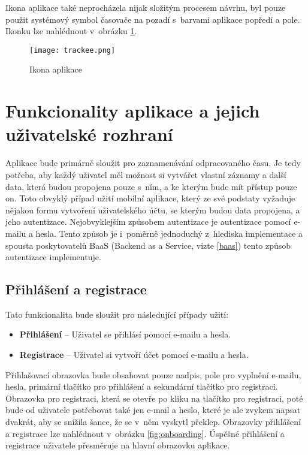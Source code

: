 Ikona aplikace také neprocházela nijak složitým procesem návrhu, byl pouze použit systémový symbol časovače na pozadí s~barvami aplikace popředí a pole. Ikonku lze nahlédnout v~obrázku \ref{fig:app-icon}.

\begin{figure}[h]
	\centering
	\texttt{[image: trackee.png]}
	\caption{Ikona aplikace}
	\label{fig:app-icon}
\end{figure}

\section{Funkcionality aplikace a jejich uživatelské rozhraní}\label{features}

Aplikace bude primárně sloužit pro zaznamenávání odpracovaného času. Je tedy potřeba, aby každý uživatel měl možnost si vytvářet vlastní záznamy a další data, která budou propojena pouze s~ním, a ke kterým bude mít přístup pouze on. Toto obvyklý případ užití mobilní aplikace, který ze své podstaty vyžaduje nějakou formu vytvoření uživatelského účtu, se kterým budou data propojena, a jeho autentizace. Nejobvyklejším způsobem autentizace je autentizace pomocí e-mailu a hesla. Tento způsob je i~poměrně jednoduchý z~hlediska implementace a spousta poskytovatelů BaaS (Backend as a Service, vizte \ref{baas}) tento způsob autentizace implementuje. 

\subsection{Přihlášení a registrace}\label{feature-onboarding}

Tato funkcionalita bude sloužit pro následující případy užití:
\begin{itemize}
\item\textbf{Přihlášení} – Uživatel se přihlásí pomocí e-mailu a hesla.
\item\textbf{Registrace} – Uživatel si vytvoří účet pomocí e-mailu a hesla.
\end{itemize}

Přihlašovací obrazovka bude obsahovat pouze nadpis, pole pro vyplnění e-mailu, hesla, primární tlačítko pro přihlášení a sekundární tlačítko pro registraci. Obrazovka pro registraci, která se otevře po kliku na tlačítko pro registraci, poté bude od uživatele potřebovat také jen e-mail a heslo, které je ale zvykem napsat dvakrát, aby se snížila šance, že se v~něm vyskytl překlep. Obrazovky přihlášení a registrace lze nahlédnout v~obrázku \ref{fig:onboarding}. Úspěšné přihlášení a registrace uživatele přesměruje na hlavní obrazovku aplikace.

